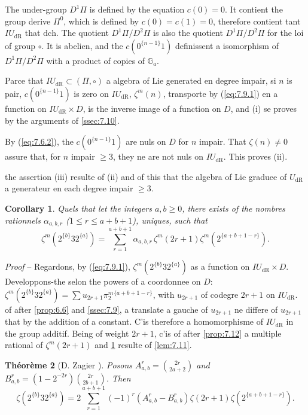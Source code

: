 \documentclass[11pt,a4paper]{article}
\theoremstyle{plain}
\newtheorem{theorem}{Th\'eor\`eme}
\newtheorem{corollary}[theorem]{Corollary}
\theoremstyle{definition}
\newcommand{\Ga}{\mathbb{G}_a}
\newcommand{\dR}{\mathrm{dR}}
\begin{document}
The under-group $D^1 \Pi$ is defined by the equation $c(0) = 0$. It contient the group derive $\Pi^0$, which is defined by $c(0) = c(1) = 0$, therefore contient tant $IU_{\dR}$ that $\mathrm{dch}$. The quotient $D^1\Pi/D^2\Pi$ is also the quotient $D^1\Pi/D^2\Pi$ for the loi of group $\circ$. It is abelien, and the $c(0^{\{n-1\}}1)$ definissent a isomorphism of $D^1\Pi/D^2\Pi$ with a product of copies of $\Ga$.

Parce that $IU_{\dR} \subset (\Pi, \circ)$ a algebra of Lie generated en degree impair, si $n$ is pair, $c(0^{\{n-1\}}1)$ is zero on $IU_{\dR}$, $\zeta^m(n)$, transporte by (\ref{eq:7.9.1}) en a function on $IU_{\dR} \times D$, is the inverse image of a function on $D$, and (i) se proves by the arguments of \ref{ssec:7.10}.

By (\ref{eq:7.6.2}), the $c(0^{\{n-1\}}1)$ are nuls on $D$ for $n$ impair. That $\zeta(n) \neq 0$ assure that, for $n$ impair $\geq 3$, they ne are not nuls on $IU_{\dR}$. This proves (ii).

the assertion (iii) resulte of (ii) and of this that the algebra of Lie graduee of $U_{\dR}$ a generateur en each degree impair $\geq 3$.

\begin{corollary}\label{cor:7.13}
Quels that let the integers $a, b \geq 0$, there exists of the nombres rationnels $\alpha_{a,b,r}$ ($1 \leq r \leq a+b+1$), uniques, such that
\begin{equation}\label{eq:7.13.1}
\zeta^m(2^{\{b\}} 3 2^{\{a\}}) = \sum_{r=1}^{a+b+1} \alpha_{a,b,r} \, \zeta^m(2r+1) \zeta^m(2^{\{a+b+1-r\}}).
\end{equation}
\end{corollary}

\noindent \textit{Proof} -- Regardons, by (\ref{eq:7.9.1}), $\zeta^m(2^{\{b\}} 3 2^{\{a\}})$ as a function on $IU_{\dR} \times D$. Developpons-the selon the powers of a coordonnee on $D$: $\zeta^m(2^{\{b\}} 3 2^{\{a\}}) = \sum u_{2r+1} \pi_2^m{}^{\{a+b+1-r\}}$, with $u_{2r+1}$ of codegre $2r+1$ on $IU_{\dR}$. of after \ref{prop:6.6} and \ref{ssec:7.9}, a translate a gauche of $u_{2r+1}$ ne differe of $u_{2r+1}$ that by the addition of a constant. C'is therefore a homomorphisme of $IU_{\dR}$ in the group additif. Being of weight $2r+1$, c'is of after \ref{prop:7.12} a multiple rational of $\zeta^m(2r+1)$ and \ref{cor:7.13} resulte of \ref{lem:7.11}.

\begin{theorem}[D. Zagier {\cite{Zagier}}]\label{thm:7.14}
Posons $A_{a,b}^r = \binom{2r}{2a+2}$ and $B_{a,b}^r = (1-2^{-2r}) \binom{2r}{2b+1}$. Then
\begin{equation}\label{eq:7.14.1}
\zeta(2^{\{b\}} 3 2^{\{a\}}) = 2 \sum_{r=1}^{a+b+1} (-1)^r (A_{a,b}^r - B_{a,b}^r) \zeta(2r+1) \zeta(2^{\{a+b+1-r\}}).
\end{equation}
\end{theorem}
\end{document}

